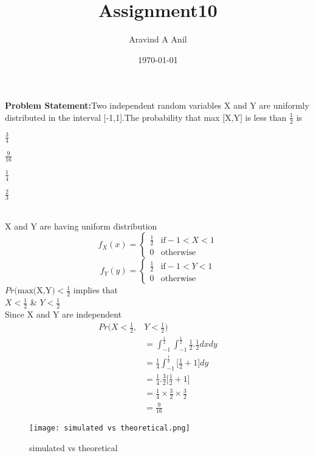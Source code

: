 \documentclass[11pt,a4paper,twocolumn]{article}
\title{Assignment10}
\author{Aravind A Anil}
\date{\today}
\begin{document}
\maketitle

\textbf{Problem Statement:}Two independent random variables X and Y
are uniformly distributed in the interval [-1,1].The probability that max [X,Y] is less than $\frac{1}{2}$ is\\[5pt]
\begin{enumerate*}[label=\alph*)]
    \item $\frac{3}{4}$\hspace{.5cm}
    \item $\frac{9}{16}$\hspace{.5cm}
    \item $\frac{1}{4}$\hspace{.5cm}
    \item $\frac{2}{3}$\hspace{.5cm}
\end{enumerate*}\\[5pt]
X and Y are having uniform distribution\\
\begin{equation*}
  f_{X}(x)=
\begin{cases}
\frac{1}{2} & \text{if} -1<X<1\\
0 & \text{otherwise}
\end{cases}
\end{equation*}
\begin{equation*}
     f_{Y}(y)=
     \begin{cases}
     \frac{1}{2} & \text{if} -1<Y<1\\
     0 & \text{otherwise}
     \end{cases}
\end{equation*}
$Pr(\text{max(X,Y)}<\frac{1}{2}$ implies that\\[5pt]
$X<\frac{1}{2}$ \& $Y<\frac{1}{2}$\\
Since X and Y are independent
\begin{align*}
    Pr(X<\frac{1}{2},&Y<\frac{1}{2})\\
    &=\int_{-1}^{\frac{1}{2}}\int_{-1}^{\frac{1}{2}}\frac{1}{2}.\frac{1}{2}dxdy\\
    &=\frac{1}{4}\int_{-1}^{\frac{1}{2}}\Big[\frac{1}{2}+1\Big]dy\\
    &=\frac{1}{4}.\frac{3}{2}\Big[\frac{1}{2}+1\Big]\\
    &=\frac{1}{4}\times\frac{3}{2}\times\frac{3}{2}\\
    &=\frac{9}{16}
\end{align*}
\begin{figure}
    \centering
    \texttt{[image: simulated vs theoretical.png]}
    \caption{simulated vs theoretical}
    \label{fig:my_label}
\end{figure}
\end{document}
